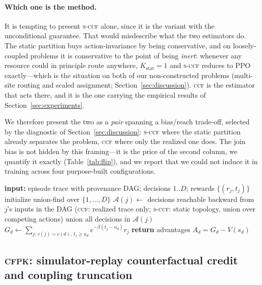 \documentclass[review,authoryear,3p,times]{elsarticle}
\newcommand{\ccf}{\textsc{ccf}}
\newcommand{\sccf}{\textsc{s-ccf}}
\newcommand{\cfpk}{\textsc{cfpk}}
\newcommand{\Kstat}{K_{\mathrm{stat}}}
\newcommand{\Ascr}{\mathcal{A}}
\begin{document}
\paragraph{Which one is the method.} It is tempting to present \sccf{} alone,
since it is the variant with the unconditional guarantee. That would misdescribe
what the two estimators do. The static partition buys action-invariance by
being conservative, and on loosely-coupled problems it is conservative to the
point of being \emph{inert}: whenever any resource could in principle route
anywhere, $\Kstat=1$ and \sccf{} reduces to PPO exactly---which is the situation
on both of our non-constructed problems (multi-site routing and scaled
assignment; Section~\ref{sec:discussion}). \ccf{} is the estimator that acts
there, and it is the one carrying the empirical results of
Section~\ref{sec:experiments}.

We therefore present the two as a \emph{pair} spanning a bias/reach trade-off,
selected by the diagnostic of Section~\ref{sec:discussion}: \sccf{} where the
static partition already separates the problem, \ccf{} where only the realized
one does. The join bias is not hidden by this framing---it is the price of the
second column, we quantify it exactly (Table~\ref{tab:flip}), and we report that
we could not induce it in training across four purpose-built configurations.

\begin{algorithm}[t]
\caption{Causal-component-factored credit (\ccf{} / \sccf, differing only in
line~4)}
\label{alg:ccf}
\begin{algorithmic}[1]
\State \textbf{input:} episode trace with provenance DAG; decisions $1..D$; rewards $\{(r_j,t_j)\}$
\State initialize union-find over $\{1,\dots,D\}$
  \State $\Ascr(j)\gets$ decisions reachable backward from $j$'s inputs in the DAG (\ccf: realized trace only; \sccf: static topology, union over competing actions)
  \State union all decisions in $\Ascr(j)$
\EndFor
{}
  \State $G_d\gets \sum_{j:\,c(j)=c(d),\,t_j\ge u_d} e^{-\beta(t_j-u_d)} r_j$
\EndFor
\State \textbf{return} advantages $A_d = G_d-V(s_d)$
\end{algorithmic}
\end{algorithm}

\subsection{\cfpk: simulator-replay counterfactual credit and coupling truncation}
\label{sec:method:cfpk}
\end{document}
